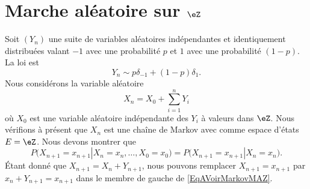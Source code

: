 \section{Marche aléatoire sur \texorpdfstring{$\eZ$}{\( \eZ\)}}

Soit \( (Y_n)\) une suite de variables aléatoires indépendantes et identiquement distribuées valant \( -1\) avec une probabilité \( p\) et \( 1\) avec une probabilité \( (1-p)\). La loi est
\begin{equation}
    Y_n\sim p\delta_{-1}+(1-p)\delta_{1}.
\end{equation}
Nous considérons la variable aléatoire
\begin{equation}
    X_n=X_0+\sum_{i=1}^nY_i
\end{equation}
où \( X_0\) est une variable aléatoire indépendante des \( Y_i\) à valeurs dans \( \eZ\). Nous vérifions à présent que \( X_n\) est une chaîne de Markov avec comme espace d'états \( E=\eZ\). Nous devons montrer que
\begin{equation}        \label{EqAVoirMarkovMAZ}
    P\big( X_{n+1}=x_{n+1}| X_n=x_n,\ldots,X_0=x_0 \big)=P\big( X_{n+1}=x_{n+1}|X_n=x_n \big).
\end{equation}
Étant donné que \( X_{n+1}=X_n+Y_{n+1}\), nous pouvons remplacer \( X_{n+1}=x_{n+1}\) par \( x_n+Y_{n+1}=x_{n+1}\) dans le membre de gauche de \ref{EqAVoirMarkovMAZ}.

